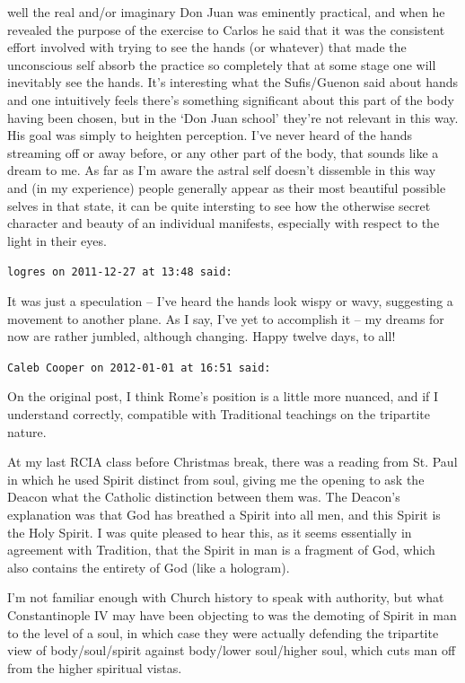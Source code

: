\begin{footnotesize}
\begin{sffamily}
well the real and/or imaginary Don Juan was eminently practical, and when he revealed the purpose of the exercise to Carlos he said that it was the consistent effort involved with trying to see the hands (or whatever) that made the unconscious self absorb the practice so completely that at some stage one will inevitably see the hands. It's interesting what the Sufis/Guenon said about hands and one intuitively feels there's something significant about this part of the body having been chosen, but in the `Don Juan school' they're not relevant in this way. His goal was simply to heighten perception. I've never heard of the hands streaming off or away before, or any other part of the body, that sounds like a dream to me. As far as I'm aware the astral self doesn't dissemble in this way and (in my experience) people generally appear as their most beautiful possible selves in that state, it can be quite intersting to see how the otherwise secret character and beauty of an individual manifests, especially with respect to the light in their eyes.


\hfill

\texttt{logres on 2011-12-27 at 13:48 said: }

It was just a speculation – I've heard the hands look wispy or wavy, suggesting a movement to another plane. As I say, I've yet to accomplish it – my dreams for now are rather jumbled, although changing. Happy twelve days, to all!


\hfill

\texttt{Caleb Cooper on 2012-01-01 at 16:51 said: }

On the original post, I think Rome's position is a little more nuanced, and if I understand correctly, compatible with Traditional teachings on the tripartite nature. 

At my last RCIA class before Christmas break, there was a reading from St. Paul in which he used Spirit distinct from soul, giving me the opening to ask the Deacon what the Catholic distinction between them was. The Deacon's explanation was that God has breathed a Spirit into all men, and this Spirit is the Holy Spirit. I was quite pleased to hear this, as it seems essentially in agreement with Tradition, that the Spirit in man is a fragment of God, which also contains the entirety of God (like a hologram).

I'm not familiar enough with Church history to speak with authority, but what Constantinople IV may have been objecting to was the demoting of Spirit in man to the level of a soul, in which case they were actually defending the tripartite view of body/soul/spirit against body/lower soul/higher soul, which cuts man off from the higher spiritual vistas.



\end{sffamily}
\end{footnotesize}
